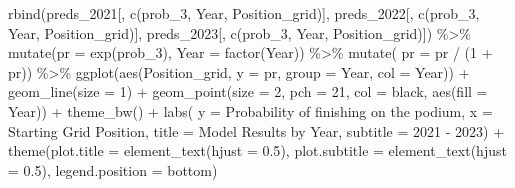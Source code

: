\documentclass[
]{book}
\newenvironment{Shaded}{\begin{snugshade}}{\end{snugshade}}
\newcommand{\AttributeTok}[1]{\textcolor[rgb]{0.77,0.63,0.00}{#1}}
\newcommand{\DecValTok}[1]{\textcolor[rgb]{0.00,0.00,0.81}{#1}}
\newcommand{\FloatTok}[1]{\textcolor[rgb]{0.00,0.00,0.81}{#1}}
\newcommand{\FunctionTok}[1]{\textcolor[rgb]{0.00,0.00,0.00}{#1}}
\newcommand{\NormalTok}[1]{#1}
\newcommand{\SpecialCharTok}[1]{\textcolor[rgb]{0.00,0.00,0.00}{#1}}
\newcommand{\StringTok}[1]{\textcolor[rgb]{0.31,0.60,0.02}{#1}}
\begin{document}
\begin{Shaded}
\begin{Highlighting}[]
\FunctionTok{rbind}\NormalTok{(preds\_2021[, }\FunctionTok{c}\NormalTok{(}\StringTok{\textquotesingle{}prob\_3\textquotesingle{}}\NormalTok{, }\StringTok{\textquotesingle{}Year\textquotesingle{}}\NormalTok{, }\StringTok{\textquotesingle{}Position\_grid\textquotesingle{}}\NormalTok{)], }
\NormalTok{      preds\_2022[, }\FunctionTok{c}\NormalTok{(}\StringTok{\textquotesingle{}prob\_3\textquotesingle{}}\NormalTok{, }\StringTok{\textquotesingle{}Year\textquotesingle{}}\NormalTok{, }\StringTok{\textquotesingle{}Position\_grid\textquotesingle{}}\NormalTok{)], }
\NormalTok{      preds\_2023[, }\FunctionTok{c}\NormalTok{(}\StringTok{\textquotesingle{}prob\_3\textquotesingle{}}\NormalTok{, }\StringTok{\textquotesingle{}Year\textquotesingle{}}\NormalTok{, }\StringTok{\textquotesingle{}Position\_grid\textquotesingle{}}\NormalTok{)]) }\SpecialCharTok{\%\textgreater{}\%}
  \FunctionTok{mutate}\NormalTok{(}\AttributeTok{pr =} \FunctionTok{exp}\NormalTok{(prob\_3),}
         \AttributeTok{Year =} \FunctionTok{factor}\NormalTok{(Year)) }\SpecialCharTok{\%\textgreater{}\%}
  \FunctionTok{mutate}\NormalTok{( }\AttributeTok{pr =}\NormalTok{ pr }\SpecialCharTok{/}\NormalTok{ (}\DecValTok{1} \SpecialCharTok{+}\NormalTok{ pr)) }\SpecialCharTok{\%\textgreater{}\%}
  \FunctionTok{ggplot}\NormalTok{(}\FunctionTok{aes}\NormalTok{(Position\_grid, }\AttributeTok{y =}\NormalTok{ pr, }\AttributeTok{group  =}\NormalTok{ Year, }\AttributeTok{col =}\NormalTok{ Year)) }\SpecialCharTok{+}
  \FunctionTok{geom\_line}\NormalTok{(}\AttributeTok{size =} \DecValTok{1}\NormalTok{) }\SpecialCharTok{+} 
  \FunctionTok{geom\_point}\NormalTok{(}\AttributeTok{size =} \DecValTok{2}\NormalTok{, }\AttributeTok{pch =} \DecValTok{21}\NormalTok{, }\AttributeTok{col =} \StringTok{\textquotesingle{}black\textquotesingle{}}\NormalTok{, }\FunctionTok{aes}\NormalTok{(}\AttributeTok{fill =}\NormalTok{ Year)) }\SpecialCharTok{+}
  \FunctionTok{theme\_bw}\NormalTok{() }\SpecialCharTok{+}
  \FunctionTok{labs}\NormalTok{( }\AttributeTok{y =} \StringTok{\textquotesingle{}Probability of finishing on the podium\textquotesingle{}}\NormalTok{,}
        \AttributeTok{x =} \StringTok{\textquotesingle{}Starting Grid Position\textquotesingle{}}\NormalTok{,}
        \AttributeTok{title =} \StringTok{\textquotesingle{}Model Results by Year\textquotesingle{}}\NormalTok{,}
        \AttributeTok{subtitle =} \StringTok{\textquotesingle{}2021 {-} 2023\textquotesingle{}}\NormalTok{)  }\SpecialCharTok{+}
  \FunctionTok{theme}\NormalTok{(}\AttributeTok{plot.title =} \FunctionTok{element\_text}\NormalTok{(}\AttributeTok{hjust =} \FloatTok{0.5}\NormalTok{),}
        \AttributeTok{plot.subtitle =} \FunctionTok{element\_text}\NormalTok{(}\AttributeTok{hjust =} \FloatTok{0.5}\NormalTok{),}
        \AttributeTok{legend.position =} \StringTok{\textquotesingle{}bottom\textquotesingle{}}\NormalTok{)}
\end{Highlighting}
\end{Shaded}
\end{document}
